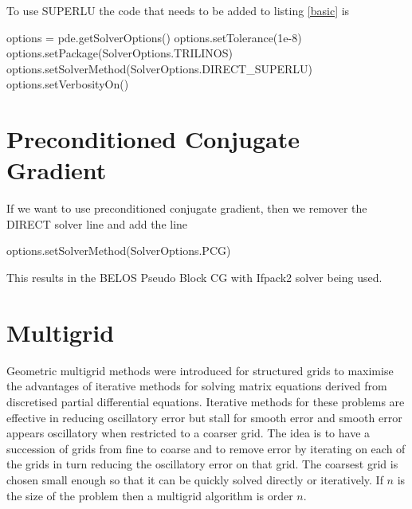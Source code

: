 To use SUPERLU the code that needs to be added to listing \ref{basic} is 
\begin{python}[caption=SuperLU, label=superLU ]
options = pde.getSolverOptions()  
options.setTolerance(1e-8)        
options.setPackage(SolverOptions.TRILINOS)
options.setSolverMethod(SolverOptions.DIRECT_SUPERLU)
options.setVerbosityOn()        
\end{python}


\section{Preconditioned Conjugate Gradient}
If we want to use preconditioned conjugate gradient, then we remover the DIRECT solver line and add the line
\begin{python}[caption=Preconditioned conjugate gradient defaults, label=PCG]
options.setSolverMethod(SolverOptions.PCG)        
\end{python}
This results in the BELOS Pseudo Block CG with Ifpack2 solver being used.  

\section{Multigrid}
Geometric multigrid methods were introduced for structured grids to maximise the advantages of iterative methods for solving matrix equations derived from discretised partial differential equations.  Iterative methods for these problems are effective in reducing oscillatory error but stall for smooth error and smooth error appears oscillatory when restricted to a coarser grid.  The idea is to have a succession of grids from fine to coarse and to remove error by iterating on each of the grids in turn reducing the oscillatory error on that grid.  The coarsest grid is chosen small enough so that it can be quickly solved directly or iteratively. If $n$ is the size of the problem then a multigrid algorithm is order $n$.

